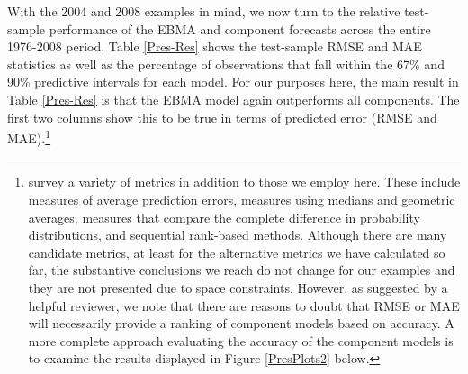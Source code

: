 \documentclass[12pt,fullpage,endnotes]{article}
\newcommand{\note}[1]{\footnote{ #1 \vspace{4 mm}}}
\begin{document}
With the 2004 and 2008 examples in mind, we now turn to the relative
test-sample performance of the EBMA and component forecasts across the
entire 1976-2008 period.  Table \ref{Pres-Res} shows the test-sample
RMSE and MAE statistics as well as the percentage of observations that
fall within the 67\% and 90\% predictive intervals for each model.  For our
purposes here, the main result in Table \ref{Pres-Res} is that the
EBMA model again outperforms all components.  The first two columns
show this to be true in terms of predicted error (RMSE and
MAE).\note{\citet{brandt:freeman:schrodt:2011} survey a variety of
  metrics in addition to those we employ here. These include measures
  of average prediction errors, measures using medians and geometric
  averages, measures that compare the complete difference in
  probability distributions, and sequential rank-based methods.
  Although there are many candidate metrics, at least for the
  alternative metrics we have calculated so far, the substantive
  conclusions we reach do not change for our examples and they are not
  presented due to space constraints.  However, as suggested by a
  helpful reviewer, we note that there are reasons to doubt that RMSE
  or MAE will necessarily provide a ranking of component models based
  on accuracy.  A more complete approach evaluating the accuracy of
  the component models is to examine the results displayed in Figure
  \ref{PresPlots2} below.}
\end{document}
